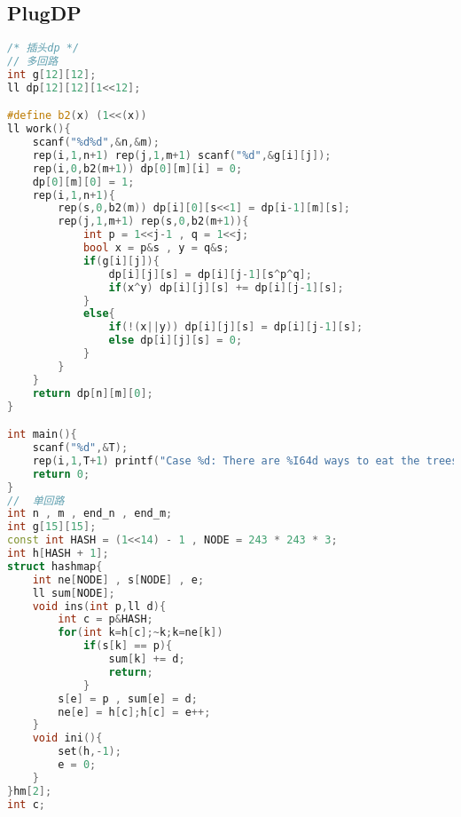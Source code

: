 \subsection{PlugDP}
\begin{lstlisting}[language=C++]
/* 插头dp */
// 多回路
int g[12][12];
ll dp[12][12][1<<12];

#define b2(x) (1<<(x))
ll work(){
    scanf("%d%d",&n,&m);
    rep(i,1,n+1) rep(j,1,m+1) scanf("%d",&g[i][j]);
    rep(i,0,b2(m+1)) dp[0][m][i] = 0;
    dp[0][m][0] = 1;
    rep(i,1,n+1){
        rep(s,0,b2(m)) dp[i][0][s<<1] = dp[i-1][m][s];
        rep(j,1,m+1) rep(s,0,b2(m+1)){
            int p = 1<<j-1 , q = 1<<j;
            bool x = p&s , y = q&s;
            if(g[i][j]){
                dp[i][j][s] = dp[i][j-1][s^p^q];
                if(x^y) dp[i][j][s] += dp[i][j-1][s];
            }
            else{
                if(!(x||y)) dp[i][j][s] = dp[i][j-1][s];
                else dp[i][j][s] = 0;
            }
        }
    }
    return dp[n][m][0];
}

int main(){
    scanf("%d",&T);
    rep(i,1,T+1) printf("Case %d: There are %I64d ways to eat the trees.\n",i,work());
    return 0;
}
//	单回路
int n , m , end_n , end_m;
int g[15][15];
const int HASH = (1<<14) - 1 , NODE = 243 * 243 * 3;
int h[HASH + 1];
struct hashmap{
    int ne[NODE] , s[NODE] , e;
    ll sum[NODE];
    void ins(int p,ll d){
        int c = p&HASH;
        for(int k=h[c];~k;k=ne[k])
            if(s[k] == p){
                sum[k] += d;
                return;
            }
        s[e] = p , sum[e] = d;
        ne[e] = h[c];h[c] = e++;
    }
    void ini(){
        set(h,-1);
        e = 0;
    }
}hm[2];
int c;


\end{lstlisting}

